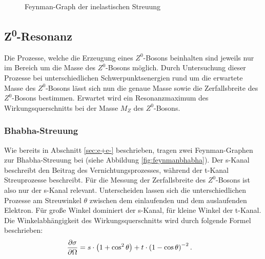 \begin{figure}
	\centering
	\caption{Feynman-Graph der inelastischen Streuung}
	\label{fig:feynmaninelastisch}
\end{figure}

\subsection{Z\textsuperscript0-Resonanz}

Die Prozesse, welche die Erzeugung eines $Z^0$-Bosons beinhalten sind jeweils nur im Bereich um die Masse des $Z^0$-Bosons möglich. Durch Untersuchung dieser Prozesse bei unterschiedlichen Schwerpunktsenergien rund um die erwartete Masse des $Z^0$-Bosons lässt sich nun die genaue Masse sowie die Zerfallsbreite des $Z^0$-Bosons bestimmen. Erwartet wird ein Resonanzmaximum des Wirkungsquerschnitts bei der Masse $M_Z$ des $Z^0$-Bosons.

\subsubsection{Bhabha-Streuung}

Wie bereits in Abschnitt \ref{sec:e+e-} beschrieben, tragen zwei Feynman-Graphen zur Bhabha-Streuung bei (siehe Abbildung \ref{fig:feynmanbhabha}). Der s-Kanal beschreibt den Beitrag des Vernichtungsprozesses, während der t-Kanal Streuprozesse beschreibt. Für die Messung der Zerfallsbreite des $Z^0$-Bosons ist also nur der s-Kanal relevant. Unterscheiden lassen sich die unterschiedlichen Prozesse am Streuwinkel $\theta$ zwischen dem einlaufenden und dem auslaufenden Elektron. Für große Winkel dominiert der s-Kanal, für kleine Winkel der t-Kanal. Die Winkelabhängigkeit des Wirkungsquerschnitts wird durch folgende Formel beschrieben:
\begin{align}
	\del[\sigma]{\Omega}&=s\cdot\left(1+\cos^2\theta\right)+t\cdot\left(1-\cos\theta\right)^{-2}\text{.}
\end{align}

